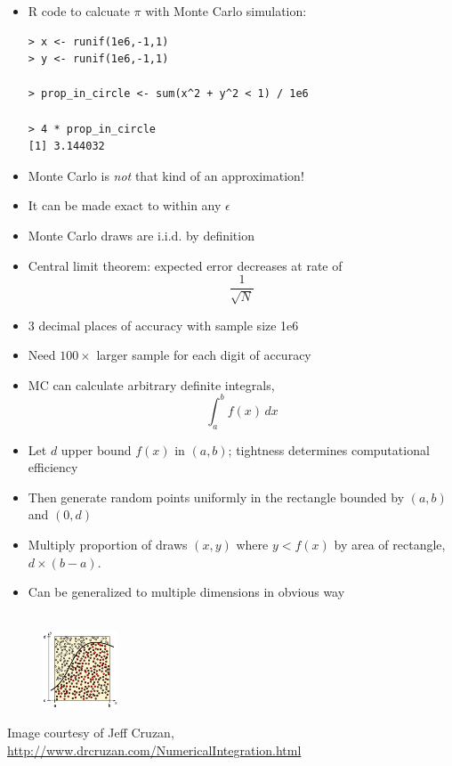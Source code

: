 \documentclass[10pt]{report}
\begin{document}
%
\begin{itemize}
\item R code to calcuate $\pi$ with Monte Carlo simulation:
\\[-8pt]
{\small
\begin{Verbatim}
> x <- runif(1e6,-1,1)
> y <- runif(1e6,-1,1)

> prop_in_circle <- sum(x^2 + y^2 < 1) / 1e6

> 4 * prop_in_circle
[1] 3.144032
\end{Verbatim}
}
\end{itemize}


%
\begin{itemize}
\item Monte Carlo is \emph{not} that kind of an approximation!
\item It can be made exact to within any $\epsilon$
\item Monte Carlo draws are i.i.d. by definition
\item Central limit theorem: expected error decreases at rate of
{\Large
\[
\frac{1}{\sqrt{N}}
\]
}
\item 3 decimal places of accuracy with 
sample size 1e6
\item Need $100 \times$ larger sample for each digit of accuracy
\end{itemize}


%
\begin{minipage}[t]{0.69\textwidth}
\vspace*{-0.1in}
\small
\begin{itemize}
\item MC can calculate arbitrary definite integrals,
\[
\int_a^b f(x) \, dx
\]
\item Let $d$ upper bound $f(x)$ in $(a,b)$;  tightness determines
computational efficiency
\item Then generate random points uniformly in the rectangle bounded by $(a,b)$ and $(0,d)$
\item Multiply proportion of draws $(x,y)$ where $y < f(x)$ by area of rectangle, $d \times (b-a)$.
\item Can be generalized to multiple dimensions in obvious way
\end{itemize}
\end{minipage}
\begin{minipage}[t]{0.29\textwidth}
\mbox{ } \\
\mbox{ } \ \ \ \ 
\includegraphics[height=0.9in]{img/monte-carlo-integration.png}
\end{minipage}
\vfill
\hfill
{\tiny Image courtesy of Jeff Cruzan, \url{http://www.drcruzan.com/NumericalIntegration.html}}
\end{document}
